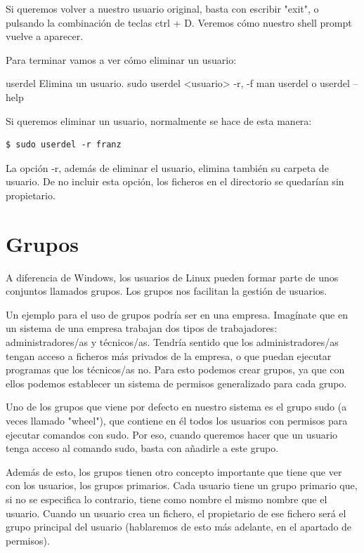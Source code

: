 Si queremos volver a nuestro usuario original, basta con escribir "exit", o pulsando la combinación de teclas ctrl + D. Veremos cómo nuestro shell prompt vuelve a aparecer.

Para terminar vamos a ver cómo eliminar un usuario:

\begin{command-info}
{userdel}
{Elimina un usuario.}
{sudo userdel <usuario>}
{-r, -f}
{man userdel o userdel --help}
\end{command-info}

Si queremos eliminar un usuario, normalmente se hace de esta manera:

\begin{tcolorbox-code}
\begin{lstlisting}
$ sudo userdel -r franz
\end{lstlisting}
\end{tcolorbox-code}

La opción -r, además de eliminar el usuario, elimina también su carpeta de usuario. De no incluir esta opción, los ficheros en el directorio se quedarían sin propietario.

\section{Grupos}

A diferencia de Windows, los usuarios de Linux pueden formar parte de unos conjuntos llamados grupos. Los grupos nos facilitan la gestión de usuarios.

Un ejemplo para el uso de grupos podría ser en una empresa. Imagínate que en un sistema de una empresa trabajan dos tipos de trabajadores: administradores/as y técnicos/as. Tendría sentido que los administradores/as tengan acceso a ficheros más privados de la empresa, o que puedan ejecutar programas que los técnicos/as no. Para esto podemos crear grupos, ya que con ellos podemos establecer un sistema de permisos generalizado para cada grupo.

Uno de los grupos que viene por defecto en nuestro sistema es el grupo sudo (a veces llamado "wheel"), que contiene en él todos los usuarios con permisos para ejecutar comandos con sudo. Por eso, cuando queremos hacer que un usuario tenga acceso al comando sudo, basta con añadirle a este grupo.

Además de esto, los grupos tienen otro concepto importante que tiene que ver con los usuarios, los grupos primarios. Cada usuario tiene un grupo primario que, si no se especifica lo contrario, tiene como nombre el mismo nombre que el usuario. Cuando un usuario crea un fichero, el propietario de ese fichero será el grupo principal del usuario (hablaremos de esto más adelante, en el apartado de permisos).

